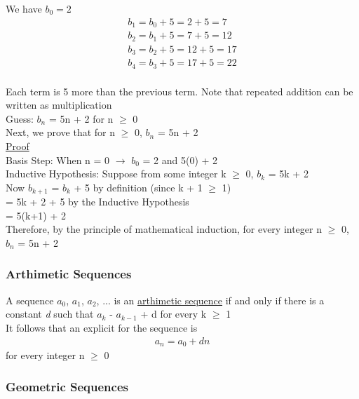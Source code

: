 \documentclass{article}
\begin{document}
We have $b_{0} = 2$
\begin{align}
b_{1} = b_{0} + 5 = 2 + 5 = 7 \\
b_{2} = b_{1} + 5 = 7 + 5 = 12 \\
b_{3} = b_{2} + 5 = 12 + 5 = 17 \\
b_{4} = b_{3} + 5 = 17 + 5 = 22 \\
\end{align}

Each term is 5 more than the previous term. Note that repeated addition can be written as multiplication \\

Guess: $b_{n}$ = 5n + 2 for n $\geq$ 0 \\

Next, we prove that for n $\geq$ 0, $b_{n}$ = 5n + 2 \\

\underline{Proof}\\

Basis Step: When n = 0 $\rightarrow$ $b_{0}$ = 2 and 5(0) + 2 \\

Inductive Hypothesis: Suppose from some integer k $\geq$ 0, $b_{k}$ = 5k + 2\\

Now $b_{k+1}$ = $b_{k}$ + 5 by definition (since k + 1 $\geq$ 1) \\
= 5k + 2 + 5 by the Inductive Hypothesis \\
= 5(k+1) + 2 \\

Therefore, by the principle of mathematical induction, for every integer n $\geq$ 0, $b_{n}$ = 5n + 2 \\

\subsubsection{Arthimetic Sequences}

A sequence $a_{0}$, $a_{1}$, $a_{2}$, ... is an \underline{arthimetic sequence} if and only if there is a constant \textit{d}
such that $a_{k}$ - $a_{k-1}$ + d for every k $\geq$ 1 \\

It follows that an explicit for the sequence is
\begin{align}
a_{n} = a_{0} + dn
\end{align}
for every integer n $\geq$ 0 \\

\subsubsection{Geometric Sequences}
\end{document}
